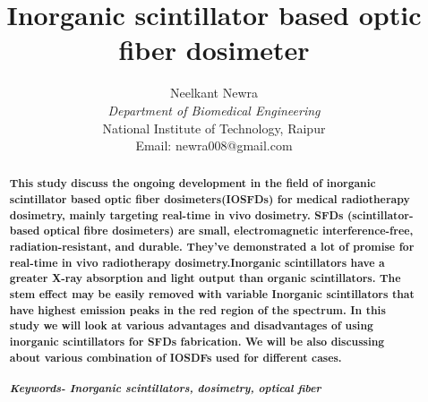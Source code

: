 \documentclass{article}
\title{\textbf{Inorganic scintillator based optic fiber dosimeter}}
\author{Neelkant Newra\\
\textit{Department of Biomedical Engineering} \\ National Institute of Technology, Raipur \\ Email: newra008@gmail.com\\}
\date{}
\begin{document}
\maketitle
\begin{abstract}\textbf{This study discuss the ongoing development in the field of inorganic scintillator based optic fiber dosimeters(IOSFDs) for medical radiotherapy dosimetry, mainly targeting real-time in vivo dosimetry. SFDs (scintillator-based optical fibre dosimeters) are small, electromagnetic interference-free, radiation-resistant, and durable. They've demonstrated a lot of promise for real-time in vivo radiotherapy dosimetry.Inorganic scintillators have a greater X-ray absorption and light output than organic scintillators. The stem effect may be easily removed with variable Inorganic scintillators  that have highest emission peaks in the red region of the spectrum. In this study we will look at various advantages and disadvantages of using inorganic scintillators for SFDs fabrication. We will be also discussing about various combination of IOSDFs used for different cases. } \\ \\
    \textbf{\textit{Keywords- Inorganic scintillators, dosimetry, optical fiber}} 
\end{abstract}
\end{document}
